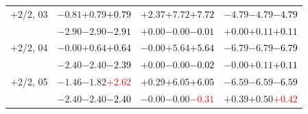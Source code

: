 \documentclass[compress]{beamer}
\begin{document}
\begin{frame}
\begin{tabular}{r | c | c | c}
$+$2/2, 03 & $-0.81$\hspace{0.1 cm}$+0.79$\hspace{0.1 cm}\textcolor{black}{$+0.79$} & $+2.37$\hspace{0.1 cm}$+7.72$\hspace{0.1 cm}\textcolor{black}{$+7.72$} & $-4.79$\hspace{0.1 cm}$-4.79$\hspace{0.1 cm}\textcolor{black}{$-4.79$} \\
           & $-2.90$\hspace{0.1 cm}$-2.90$\hspace{0.1 cm}\textcolor{black}{$-2.91$} & $+0.00$\hspace{0.1 cm}$-0.00$\hspace{0.1 cm}\textcolor{black}{$-0.01$} & $+0.00$\hspace{0.1 cm}$+0.11$\hspace{0.1 cm}\textcolor{black}{$+0.11$} \\
$+$2/2, 04 & $-0.00$\hspace{0.1 cm}$+0.64$\hspace{0.1 cm}\textcolor{black}{$+0.64$} & $-0.00$\hspace{0.1 cm}$+5.64$\hspace{0.1 cm}\textcolor{black}{$+5.64$} & $-6.79$\hspace{0.1 cm}$-6.79$\hspace{0.1 cm}\textcolor{black}{$-6.79$} \\
           & $-2.40$\hspace{0.1 cm}$-2.40$\hspace{0.1 cm}\textcolor{black}{$-2.39$} & $+0.00$\hspace{0.1 cm}$-0.00$\hspace{0.1 cm}\textcolor{black}{$-0.02$} & $-0.00$\hspace{0.1 cm}$+0.11$\hspace{0.1 cm}\textcolor{black}{$+0.11$} \\
$+$2/2, 05 & $-1.46$\hspace{0.1 cm}$-1.82$\hspace{0.1 cm}\textcolor{red}{$+2.62$} & $+0.29$\hspace{0.1 cm}$+6.05$\hspace{0.1 cm}\textcolor{black}{$+6.05$} & $-6.59$\hspace{0.1 cm}$-6.59$\hspace{0.1 cm}\textcolor{black}{$-6.59$} \\
           & $-2.40$\hspace{0.1 cm}$-2.40$\hspace{0.1 cm}\textcolor{black}{$-2.40$} & $-0.00$\hspace{0.1 cm}$-0.00$\hspace{0.1 cm}\textcolor{red}{$-0.31$} & $+0.39$\hspace{0.1 cm}$+0.50$\hspace{0.1 cm}\textcolor{red}{$+0.42$} \\

\end{tabular}
\end{frame}
\end{document}
